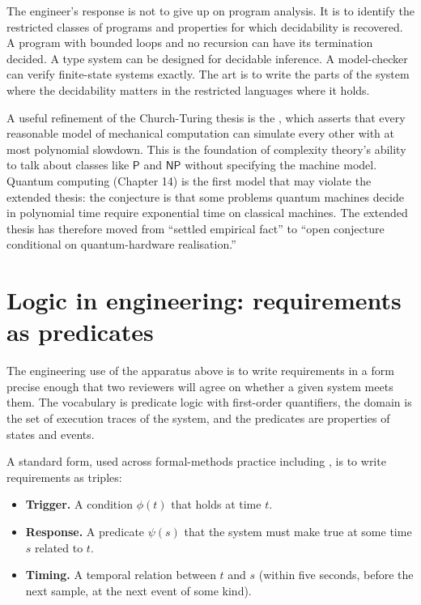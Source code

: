 The engineer's response is not to give up on program analysis. It is to identify the restricted classes of programs and properties for which decidability is recovered. A program with bounded loops and no recursion can have its termination decided. A type system can be designed for decidable inference. A model-checker can verify finite-state systems exactly. The art is to write the parts of the system where the decidability matters in the restricted languages where it holds.

\begin{mastery}
A useful refinement of the Church-Turing thesis is the , which asserts that every reasonable model of mechanical computation can simulate every other with at most polynomial slowdown. This is the foundation of complexity theory's ability to talk about classes like $\mathsf{P}$ and $\mathsf{NP}$ without specifying the machine model. Quantum computing (Chapter 14) is the first model that may violate the extended thesis: the conjecture is that some problems quantum machines decide in polynomial time require exponential time on classical machines. The extended thesis has therefore moved from ``settled empirical fact'' to ``open conjecture conditional on quantum-hardware realisation.''
\end{mastery}

\section{Logic in engineering: requirements as predicates}

The engineering use of the apparatus above is to write requirements in a form precise enough that two reviewers will agree on whether a given system meets them. The vocabulary is predicate logic with first-order quantifiers, the domain is the set of execution traces of the system, and the predicates are properties of states and events.

A standard form, used across formal-methods practice including \cite{text:leveson-safeware}, is to write requirements as triples:

\begin{itemize}[leftmargin=*]
  \item \textbf{Trigger.} A condition $\phi(t)$ that holds at time $t$.
  \item \textbf{Response.} A predicate $\psi(s)$ that the system must make true at some time $s$ related to $t$.
  \item \textbf{Timing.} A temporal relation between $t$ and $s$ (within five seconds, before the next sample, at the next event of some kind).
\end{itemize}

